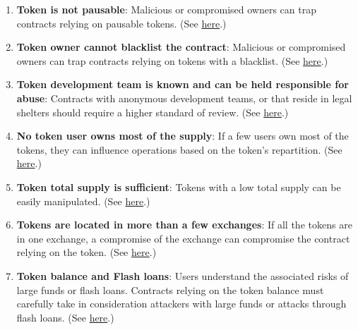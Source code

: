 \begin{enumerate}
\item\textbf{Token is not pausable}: Malicious or compromised owners can trap contracts relying on pausable tokens. (See \href{https://github.com/crytic/building-secure-contracts/blob/master/development-guidelines/token\_integration.md\#owner-privileges}{here}.)

\item\textbf{Token owner cannot blacklist the contract}: Malicious or compromised owners can trap contracts relying on tokens with a blacklist. (See \href{https://github.com/crytic/building-secure-contracts/blob/master/development-guidelines/token\_integration.md\#owner-privileges}{here}.)

\item\textbf{Token development team is known and can be held responsible for abuse}: Contracts with anonymous development teams, or that reside in legal shelters should require a higher standard of review. (See \href{https://github.com/crytic/building-secure-contracts/blob/master/development-guidelines/token\_integration.md\#owner-privileges}{here}.)

\item\textbf{No token user owns most of the supply}: If a few users own most of the tokens, they can influence operations based on the token's repartition. (See \href{https://github.com/crytic/building-secure-contracts/blob/master/development-guidelines/token\_integration.md\#token-scarcity}{here}.)

\item\textbf{Token total supply is sufficient}: Tokens with a low total supply can be easily manipulated. (See \href{https://github.com/crytic/building-secure-contracts/blob/master/development-guidelines/token\_integration.md\#token-scarcity}{here}.)

\item\textbf{Tokens are located in more than a few exchanges}: If all the tokens are in one exchange, a compromise of the exchange can compromise the contract relying on the token. (See \href{https://github.com/crytic/building-secure-contracts/blob/master/development-guidelines/token\_integration.md\#token-scarcity}{here}.)

\item\textbf{Token balance and Flash loans}: Users understand the associated risks of large funds or flash loans. Contracts relying on the token balance must carefully take in consideration attackers with large funds or attacks through flash loans. (See \href{https://github.com/crytic/building-secure-contracts/blob/master/development-guidelines/token\_integration.md\#token-scarcity}{here}.)


\end{enumerate}
